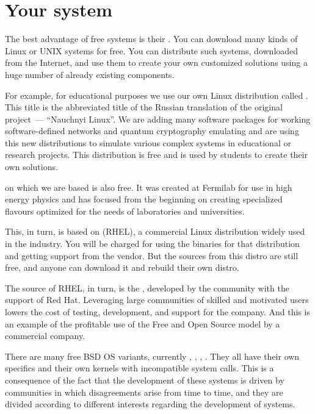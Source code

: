 \section*{Your system}

The best advantage of free systems is their . You can
download many kinds of Linux or UNIX systems for free. You can distribute
such systems, downloaded from the Internet, and use them to create your
own customized solutions using a huge number of already existing
components.

For example, for educational purposes we use our own Linux distribution
called . This title is the abbreviated title of the Russian
translation of the original  project~---
``Nauchnyi Linux''. We are adding many software packages for working
software-defined networks and quantum cryptography emulating and are using
this new distributions to simulate various complex systems in educational or
research projects. This distribution is free and is used by students to
create their own solutions.

 on which we are based is also free. It was created at
Fermilab for use in high energy physics and has focused from the beginning
on creating specialized flavours optimized for the needs of laboratories
and universities.

This, in turn, is based on  (RHEL),
a commercial Linux distribution widely used in the industry. You will be
charged for using the binaries for that distribution and getting support
from the vendor. But the sources from this distro are still free, and anyone
can download it and rebuild their own distro.

The source of RHEL, in turn, is the ,
developed by the community with the support of Red Hat. Leveraging large
communities of skilled and motivated users lowers the cost of testing,
development, and support for the company. And this is an example of
the profitable use of the Free and Open Source model by a commercial company.

There are many free BSD OS variants, currently , ,
, . They all have their own specifics and
their own kernels with incompatible system calls. This is a consequence of
the fact that the development of these systems is driven by communities in
which disagreements arise from time to time, and they are divided according
to different interests regarding the development of systems.

